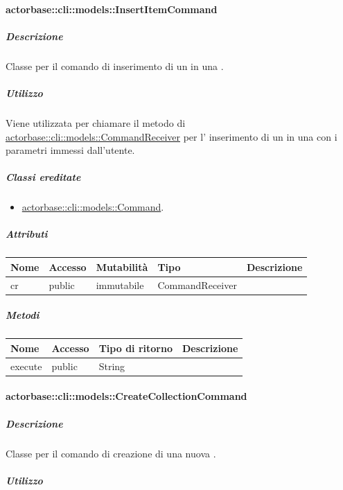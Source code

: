 \documentclass{scalatekids-article}
\begin{document}
\paragraph{actorbase::cli::models::InsertItemCommand}
\label{sec:actorbase::cli::models::InsertItemCommand}

\subparagraph{Descrizione}

Classe per il comando di inserimento di un  in una
.

\subparagraph{Utilizzo}

Viene utilizzata per chiamare il metodo di \hyperref[sec:actorbase::cli::models::CommandReceiver]{actorbase::cli::models::CommandReceiver} per l' inserimento di un  in una  con i parametri immessi dall'utente.

\subparagraph{Classi ereditate}

\begin{itemize}
\item \hyperref[sec:actorbase::cli::models::Command]{actorbase::cli::models::Command}.
\end{itemize}

\subparagraph{Attributi}

\begin{tabular}{| l | l | l | l | l |}
  \hline
  Nome & Accesso & Mutabilità & Tipo & Descrizione\\
  \hline
  cr & public & immutabile & CommandReceiver & \\
  \hline
\end{tabular}

\subparagraph{Metodi}

\begin{tabular}{| l | l | l | l |}
  \hline
  Nome & Accesso & Tipo di ritorno & Descrizione\\
  \hline
  execute & public & String & \\
  \hline
\end{tabular}

\paragraph{actorbase::cli::models::CreateCollectionCommand}
\label{sec:actorbase::cli::models::CreateCollectionCommand}

\subparagraph{Descrizione}

Classe per il comando di creazione di una nuova .

\subparagraph{Utilizzo}
\end{document}
